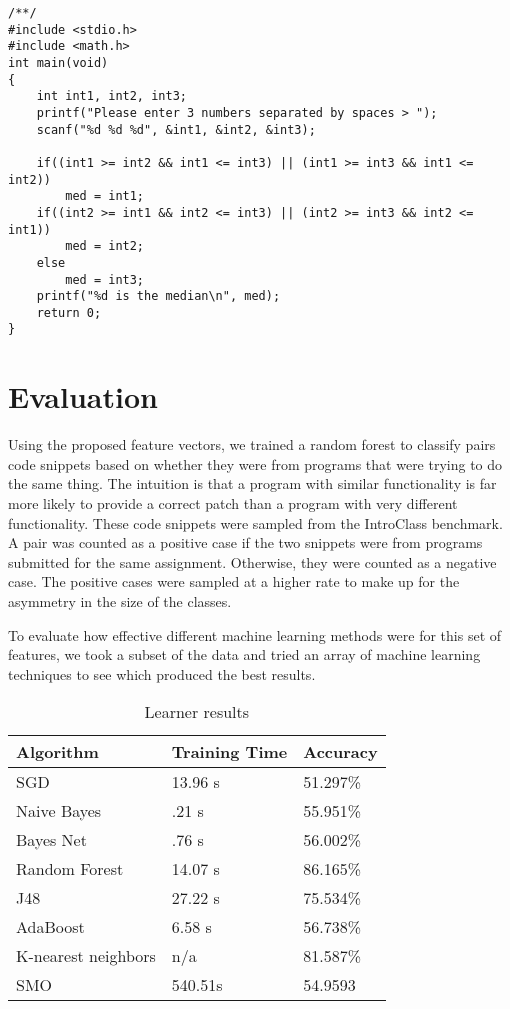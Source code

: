 \documentclass[conference]{IEEEtran}
\begin{document}
\begin{lstlisting}
/**/
#include <stdio.h>
#include <math.h>
int main(void)
{
	int int1, int2, int3; 
	printf("Please enter 3 numbers separated by spaces > ");
	scanf("%d %d %d", &int1, &int2, &int3);

	if((int1 >= int2 && int1 <= int3) || (int1 >= int3 && int1 <= int2))
		med = int1;
    if((int2 >= int1 && int2 <= int3) || (int2 >= int3 && int2 <= int1))
        med = int2;
    else
        med = int3;
    printf("%d is the median\n", med);
	return 0;
}                                             
\end{lstlisting}

\section{Evaluation}
Using the proposed feature vectors, we trained a random forest to classify pairs code snippets based on whether they were from programs that were trying to do the same thing. 
The intuition is that a program with similar functionality is far more likely to provide a correct patch than a program with very different functionality. 
These code snippets were sampled from the IntroClass benchmark. 
A pair was counted as a positive case if the two snippets were from programs submitted for the same assignment. 
Otherwise, they were counted as a negative case. 
The positive cases were sampled at a higher rate to make up for the asymmetry in the size of the classes. 

To evaluate how effective different machine learning methods were for this set of features, we took a subset of the data and tried an array of machine learning techniques to see which produced the best results.

\begin{table}[H]
\centering
\caption{Learner results}
\label{}
\begin{tabular}{lll}
\hline \hline
Algorithm & Training Time & Accuracy \\
\hline
SGD                 & 13.96 s 	& 51.297\% \\
Naive Bayes         & .21 s   	& 55.951\% \\
Bayes Net           & .76 s   	& 56.002\% \\
Random Forest       & 14.07 s 	& 86.165\% \\
J48                 & 27.22 s 	& 75.534\% \\
AdaBoost            & 6.58 s  	& 56.738\% \\
K-nearest neighbors & n/a    	& 81.587\% \\
SMO					& 540.51s	& 54.9593
\end{tabular}
\end{table}
\end{document}
